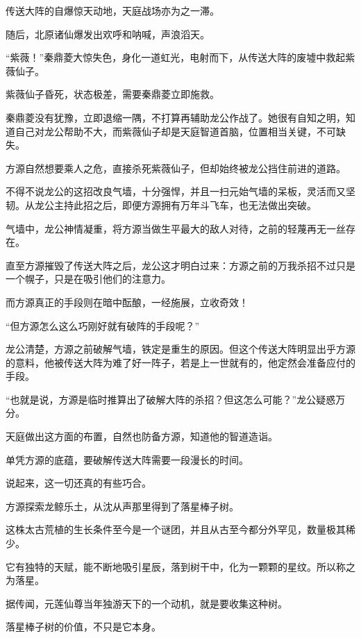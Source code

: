 
\begin{this_body}

传送大阵的自爆惊天动地，天庭战场亦为之一滞。

随后，北原诸仙爆发出欢呼和呐喊，声浪滔天。

“紫薇！”秦鼎菱大惊失色，身化一道虹光，电射而下，从传送大阵的废墟中救起紫薇仙子。

紫薇仙子昏死，状态极差，需要秦鼎菱立即施救。

秦鼎菱没有犹豫，立即退缩一隅，不打算再辅助龙公作战了。她很有自知之明，知道自己对龙公帮助不大，而紫薇仙子却是天庭智道首脑，位置相当关键，不可缺失。

方源自然想要乘人之危，直接杀死紫薇仙子，但却始终被龙公挡住前进的道路。

不得不说龙公的这招改良气墙，十分强悍，并且一扫元始气墙的呆板，灵活而又坚韧。从龙公主持此招之后，即便方源拥有万年斗飞车，也无法做出突破。

气墙中，龙公神情凝重，将方源当做生平最大的敌人对待，之前的轻蔑再无一丝存在。

直至方源摧毁了传送大阵之后，龙公这才明白过来：方源之前的万我杀招不过只是一个幌子，只是在吸引他们的注意力。

而方源真正的手段则在暗中酝酿，一经施展，立收奇效！

“但方源怎么这么巧刚好就有破阵的手段呢？”

龙公清楚，方源之前破解气墙，铁定是重生的原因。但这个传送大阵明显出乎方源的意料，他被传送大阵为难了好一阵子，若是上一世就有的，他定然会准备应付的手段。

“也就是说，方源是临时推算出了破解大阵的杀招？但这怎么可能？”龙公疑惑万分。

天庭做出这方面的布置，自然也防备方源，知道他的智道造诣。

单凭方源的底蕴，要破解传送大阵需要一段漫长的时间。

说起来，这一切还真的有些巧合。

方源探索龙鲸乐土，从沈从声那里得到了落星棒子树。

这株太古荒植的生长条件至今是一个谜团，并且从古至今都分外罕见，数量极其稀少。

它有独特的天赋，能不断地吸引星辰，落到树干中，化为一颗颗的星纹。所以称之为落星。

据传闻，元莲仙尊当年独游天下的一个动机，就是要收集这种树。

落星棒子树的价值，不只是它本身。


\end{this_body}
